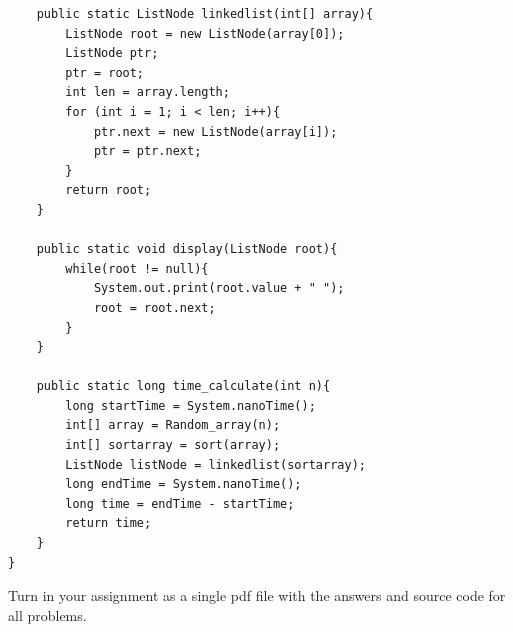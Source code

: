 \documentclass{article}
\newenvironment{sol}[1][Solution]{\begin{trivlist}\item[\hskip\labelsep {\bfseries #1:}]}{\end{trivlist}}
\begin{document}
\begin{enumerate}
\begin{sol}
\begin{enumerate}
\begin{verbatim}
    public static ListNode linkedlist(int[] array){
        ListNode root = new ListNode(array[0]);
        ListNode ptr;
        ptr = root;
        int len = array.length;
        for (int i = 1; i < len; i++){
            ptr.next = new ListNode(array[i]);
            ptr = ptr.next;
        }
        return root;
    }

    public static void display(ListNode root){
        while(root != null){
            System.out.print(root.value + " ");
            root = root.next;
        }
    }

    public static long time_calculate(int n){
        long startTime = System.nanoTime();
        int[] array = Random_array(n);
        int[] sortarray = sort(array);
        ListNode listNode = linkedlist(sortarray);
        long endTime = System.nanoTime();
        long time = endTime - startTime;
        return time;
    }
}

\end{verbatim}
\end{enumerate}
    
\end{sol}
\end{enumerate}
Turn in your assignment as a single pdf file with the answers and source code for all problems.
\end{document}
